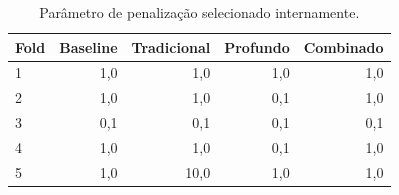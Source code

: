 \begin{table}[htbp]
\centering\small
\caption{Parâmetro de penalização selecionado internamente.}
\label{tab:alphas}
\begin{tabular}{lrrrr}
\toprule
Fold & Baseline & Tradicional & Profundo & Combinado \\
\midrule
1 & 1,0 & 1,0 & 1,0 & 1,0 \\
2 & 1,0 & 1,0 & 0,1 & 1,0 \\
3 & 0,1 & 0,1 & 0,1 & 0,1 \\
4 & 1,0 & 1,0 & 0,1 & 1,0 \\
5 & 1,0 & 10,0 & 1,0 & 1,0 \\
\bottomrule
\end{tabular}
\end{table}
